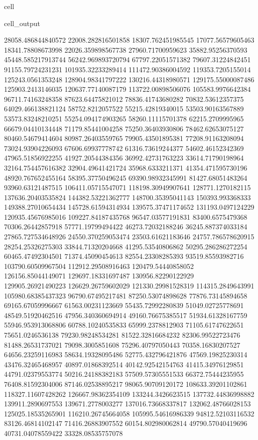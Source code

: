 \documentclass[letterpaper,10pt,english]{jupyterBook}
\begin{document}
\begin{sphinxuseclass}{cell}
\begin{sphinxVerbatimOutput}
\begin{sphinxuseclass}{cell_output}
\begin{sphinxVerbatim}[commandchars=\\\{\}]
28058.486844840572  22008.282816501858  18307.762451985545  17077.56579605463  18341.78808673998  22026.359898567738  27960.71700959623  35882.95256370593  45448.585217913744  56242.969893720794  67797.22051571382  79607.31224842451  91155.79724231231  101935.32233289414  111472.90386004592  119353.7205155014  125243.0561353248  128904.98341797222  130216.44318980571  129175.55000087486  125903.2413146035  120637.77140087179  113722.00898506076  105583.9976642384  96711.74163248358  87623.64475821012  78836.41743680282  70832.53612357375  64029.466138821124  58752.8212057522  55215.42819340015  53503.90163567889  53573.83248210251  55254.094174903265  58260.11115701378  62215.2709995965  66679.04410134448  71179.85441004258  75250.36403930806  78462.62653075127  80460.54679414604  80987.26403559765  79905.43501895381  77208.91163208094  73024.93904226093  67606.69937778742  61316.73619244377  54602.46152342369  47965.51856922255  41927.20544384356  36992.42731763223  33614.71790198964  32164.754457616382  32904.49641421724  35968.6333211371  41354.471595730196  48920.767652455164  58395.37750496245  69390.98932345991  81427.68051483264  93960.63121487515  106411.05715547071  118198.30949907641  128771.1270182115  137636.20403535824  144382.53221362777  148700.35395041143  150393.993368333  149388.27010654434  145728.61594314934  139575.37471174652  131193.0497124229  120935.45676985016  109227.84187435768  96547.03577191831  83400.6575479368  70306.26442857918  57771.19799494422  46273.72032188246  36245.887374033184  
27865.727534648926  24550.370259053474  23503.61621183646  24757.786578620915  28254.25326275303  33844.71320204668  41295.53540806862  50295.286286272254  60465.47492304501  71374.45090454613  82554.23308285393  93519.85593982716  103790.60509967504  112912.29508916463  120479.54440858052  126156.85044149071  129697.18331697487  130956.82290122929  129905.26921490223  126629.26759602029  121330.29981528319  114315.2849643991  105980.68385437323  96790.67495217481  87250.53074898628  77876.73145894658  69165.67059996667  61563.00231123669  55435.72992280839  51049.02725778691  48549.51920462516  47956.340360694914  49160.76675385517  51934.61328167759  55946.953913068806  60788.10240535833  65999.2378812903  71105.61747622651  75651.0246536138  79230.98248534281  81522.32816684232  82306.99522723476  81488.26531737021  79098.3005851608  75296.40797050443  70358.16830207527  64656.23259116983  58634.19328095486  52775.432796421876  47569.19825230314  43476.32465468957  40897.01868392514  40142.92542154763  41415.34976129851  44791.02379553774  50216.24188382183  57509.57305551533  66372.75444235955  76408.81592304006  87146.02538895217  98065.90709120172  108633.39201102861  118327.11607428262  126667.98362354109  133244.3426623515  137732.44836998882  139911.2890697553  139671.2778003277  137016.73668337817  132062.48766028153  125025.18535265901  116210.26745664058  105995.54616986339  94812.52103116532  83126.46814102147  71416.26883907552  60154.802980062814  49790.57040419696  40731.04078559422  33328.08535757078  

\end{sphinxVerbatim}
\end{sphinxuseclass}
\end{sphinxVerbatimOutput}
\end{sphinxuseclass}
\end{document}
